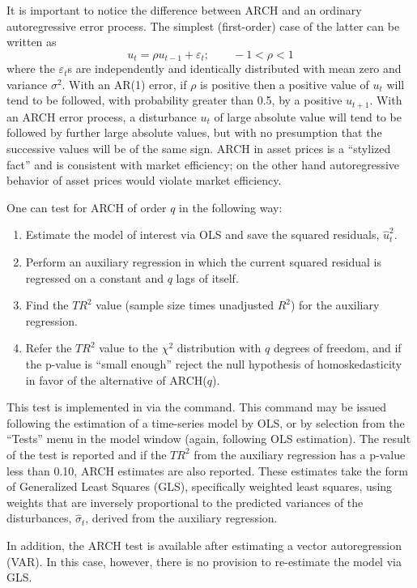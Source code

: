 It is important to notice the difference between ARCH and an ordinary
autoregressive error process.  The simplest (first-order) case of the
latter can be written as
\[
u_t = \rho u_{t-1} + \varepsilon_t; \qquad -1 < \rho < 1
\]
where the $\varepsilon_t$s are independently and identically
distributed with mean zero and variance $\sigma^2$.  With an
AR(1) error, if $\rho$ is positive then a positive value of $u_t$ will
tend to be followed, with probability greater than 0.5, by a positive
$u_{t+1}$.  With an ARCH error process, a disturbance $u_t$ of large
absolute value will tend to be followed by further large absolute
values, but with no presumption that the successive values will be of
the same sign.  ARCH in asset prices is a ``stylized fact'' and is
consistent with market efficiency; on the other hand autoregressive
behavior of asset prices would violate market efficiency.

One can test for ARCH of order $q$ in the following
way:
\begin{enumerate}
\item Estimate the model of interest via OLS and save the squared
  residuals, $\hat{u}^2_t$.
\item Perform an auxiliary regression in which the current squared
  residual is regressed on a constant and $q$ lags of itself.
\item Find the $TR^2$ value (sample size times unadjusted $R^2$) for
  the auxiliary regression.
\item Refer the $TR^2$ value to the $\chi^2$ distribution with $q$
  degrees of freedom, and if the p-value is ``small enough'' reject
  the null hypothesis of homoskedasticity in favor of the alternative
  of ARCH($q$).
\end{enumerate}

This test is implemented in  via the  command.
This command may be issued following the estimation of a time-series
model by OLS, or by selection from the ``Tests'' menu in the model
window (again, following OLS estimation).  The result of the test is
reported and if the $TR^2$ from the auxiliary regression has a p-value
less than 0.10, ARCH estimates are also reported.  These estimates
take the form of Generalized Least Squares (GLS), specifically
weighted least squares, using weights that are inversely proportional
to the predicted variances of the disturbances, $\hat{\sigma}_t$,
derived from the auxiliary regression.

In addition, the ARCH test is available after estimating a vector
autoregression (VAR).  In this case, however, there is no provision to
re-estimate the model via GLS.

